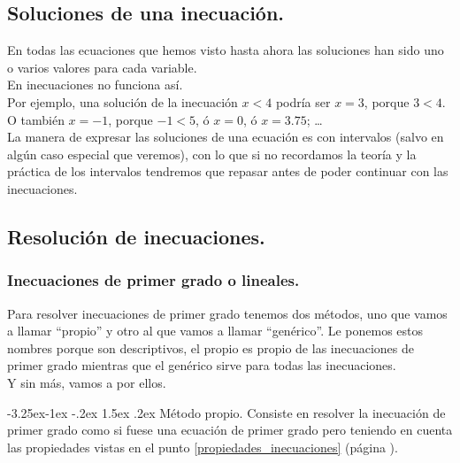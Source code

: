 \documentclass[a4paper,11pt,answers]{exam}
\makeatletter
\renewcommand\paragraph{\@startsection{paragraph}{4}{\z@}%
                                     {-3.25ex\@plus -1ex \@minus -.2ex}%
                                     {1.5ex \@plus .2ex}%
                                     {\normalfont\normalsize\bfseries}}
\makeatother
\begin{document}
  \subsection{Soluciones de una inecuación.}
  En todas las ecuaciones que hemos visto hasta ahora las soluciones han sido uno o varios valores para cada variable.\\
  
  En inecuaciones no funciona así.\\
  Por ejemplo, una solución de la inecuación $x < 4$ podría ser $x = 3$, porque $3 <4$.\\
  O también $x = -1$, porque $-1 < 5$, ó $x = 0$, ó $x = 3.75$; \dots\\

  La manera de expresar las soluciones de una ecuación es con intervalos (salvo en algún caso especial que veremos),
  con lo que si no recordamos la teoría y la práctica de los intervalos tendremos que repasar antes de poder
  continuar con las inecuaciones.

  \subsection{Resolución de inecuaciones.}
  \subsubsection{Inecuaciones de primer grado o lineales.}
  Para resolver inecuaciones de primer grado tenemos dos métodos, uno que vamos a llamar ``propio'' y otro al que
  vamos a llamar ``genérico''. Le ponemos estos nombres porque son descriptivos, el propio es propio de las
  inecuaciones de primer grado mientras que el genérico sirve para todas las inecuaciones.\\
  Y sin más, vamos a por ellos.
  
  \paragraph{Método propio.}
  Consiste en resolver la inecuación de primer grado como si fuese una ecuación de primer grado pero teniendo
  en cuenta las propiedades vistas en
  el punto \ref{propiedades_inecuaciones} (página \pageref{propiedades_inecuaciones}).\\
  
\end{document}
